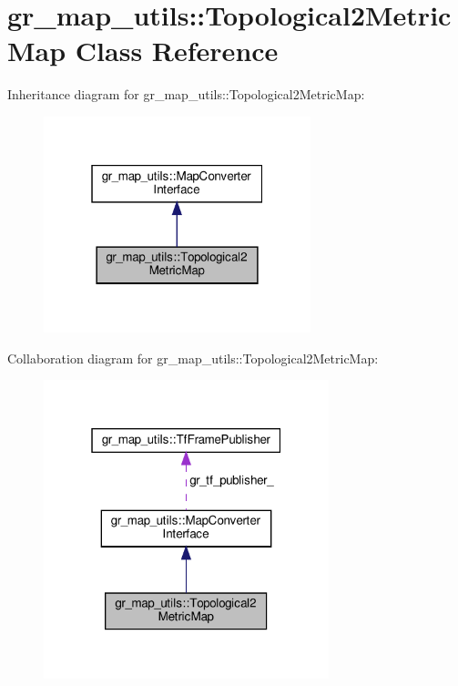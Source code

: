 \hypertarget{classgr__map__utils_1_1Topological2MetricMap}{}\section{gr\+\_\+map\+\_\+utils\+:\+:Topological2\+Metric\+Map Class Reference}
\label{classgr__map__utils_1_1Topological2MetricMap}


Inheritance diagram for gr\+\_\+map\+\_\+utils\+:\+:Topological2\+Metric\+Map\+:
\nopagebreak
\begin{figure}[H]
\begin{center}
\leavevmode
\includegraphics[width=220pt]{classgr__map__utils_1_1Topological2MetricMap__inherit__graph}
\end{center}
\end{figure}


Collaboration diagram for gr\+\_\+map\+\_\+utils\+:\+:Topological2\+Metric\+Map\+:
\nopagebreak
\begin{figure}[H]
\begin{center}
\leavevmode
\includegraphics[width=235pt]{classgr__map__utils_1_1Topological2MetricMap__coll__graph}
\end{center}
\end{figure}
